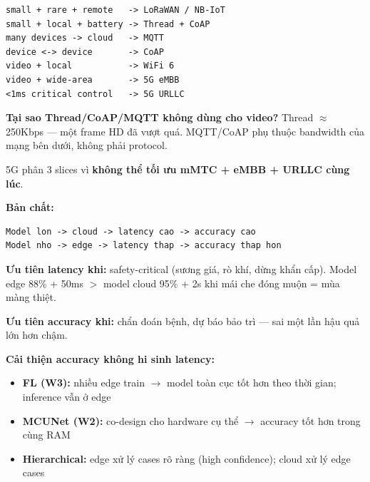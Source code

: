 \documentclass[9pt,a4paper,twocolumn]{article}
\begin{document}
\begin{tcolorbox}[deepbox, title={Chọn Protocol Truyền Thông}]

\begin{lstlisting}
small + rare + remote   -> LoRaWAN / NB-IoT
small + local + battery -> Thread + CoAP
many devices -> cloud   -> MQTT
device <-> device       -> CoAP
video + local           -> WiFi 6
video + wide-area       -> 5G eMBB
<1ms critical control   -> 5G URLLC
\end{lstlisting}

\textbf{Tại sao Thread/CoAP/MQTT không dùng cho video?}
Thread $\approx$250Kbps --- một frame HD đã vượt quá.
MQTT/CoAP phụ thuộc bandwidth của mạng bên dưới, không phải protocol.

5G phân 3 slices vì \textbf{không thể tối ưu mMTC + eMBB + URLLC cùng lúc}.

\end{tcolorbox}

\begin{tcolorbox}[deepbox, title={Trade-off: Latency vs Accuracy}]

\textbf{Bản chất:}
\begin{lstlisting}
Model lon -> cloud -> latency cao -> accuracy cao
Model nho -> edge -> latency thap -> accuracy thap hon
\end{lstlisting}

\textbf{Ưu tiên latency khi:} safety-critical (sương giá, rò khí, dừng khẩn cấp).
Model edge 88\% + 50ms $>$ model cloud 95\% + 2s khi mái che đóng muộn = mùa màng thiệt.

\textbf{Ưu tiên accuracy khi:} chẩn đoán bệnh, dự báo bảo trì --- sai một lần hậu quả lớn hơn chậm.

\textbf{Cải thiện accuracy không hi sinh latency:}
\begin{itemize}
  \item \textbf{FL (W3):} nhiều edge train $\rightarrow$ model toàn cục tốt hơn theo thời gian; inference vẫn ở edge
  \item \textbf{MCUNet (W2):} co-design cho hardware cụ thể $\rightarrow$ accuracy tốt hơn trong cùng RAM
  \item \textbf{Hierarchical:} edge xử lý cases rõ ràng (high confidence); cloud xử lý edge cases
\end{itemize}

\end{tcolorbox}
\end{document}
